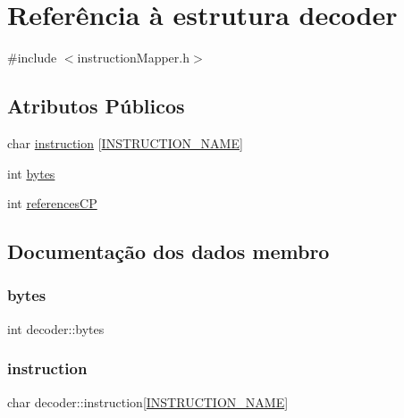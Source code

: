 \hypertarget{structdecoder}{}\section{Referência à estrutura decoder}
\label{structdecoder}


{\ttfamily \#include $<$instruction\+Mapper.\+h$>$}

\subsection*{Atributos Públicos}
\begin{DoxyCompactItemize}
\item 
char \hyperlink{structdecoder_a42764c8ec301d782501a50aa1a94af46}{instruction} \mbox{[}\hyperlink{instruction_mapper_8h_ab77522c65df7d18cddc66f4f74a47f29}{I\+N\+S\+T\+R\+U\+C\+T\+I\+O\+N\+\_\+\+N\+A\+ME}\mbox{]}
\item 
int \hyperlink{structdecoder_af15baf546bdc8f5b29e4b49c2ec3876d}{bytes}
\item 
int \hyperlink{structdecoder_a2f809cd678fa1d3f8dcf7125d466bc4f}{references\+CP}
\end{DoxyCompactItemize}


\subsection{Documentação dos dados membro}
\mbox{\label{structdecoder_af15baf546bdc8f5b29e4b49c2ec3876d}} 
\subsubsection{\texorpdfstring{bytes}{bytes}}
{\footnotesize\ttfamily int decoder\+::bytes}

\mbox{\label{structdecoder_a42764c8ec301d782501a50aa1a94af46}} 
\subsubsection{\texorpdfstring{instruction}{instruction}}
{\footnotesize\ttfamily char decoder\+::instruction\mbox{[}\hyperlink{instruction_mapper_8h_ab77522c65df7d18cddc66f4f74a47f29}{I\+N\+S\+T\+R\+U\+C\+T\+I\+O\+N\+\_\+\+N\+A\+ME}\mbox{]}}

